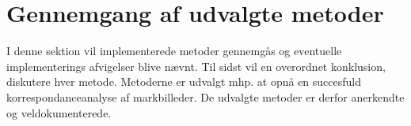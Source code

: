 \chapter{Gennemgang af udvalgte metoder}\label{sec:detmet}
I denne sektion vil implementerede metoder gennemgås og eventuelle implementerings afvigelser blive nævnt. Til sidst vil en overordnet konklusion, diskutere hver metode. Metoderne er udvalgt mhp. at opnå en succesfuld korrespondanceanalyse af markbilleder. De udvalgte metoder er derfor anerkendte og veldokumenterede.





